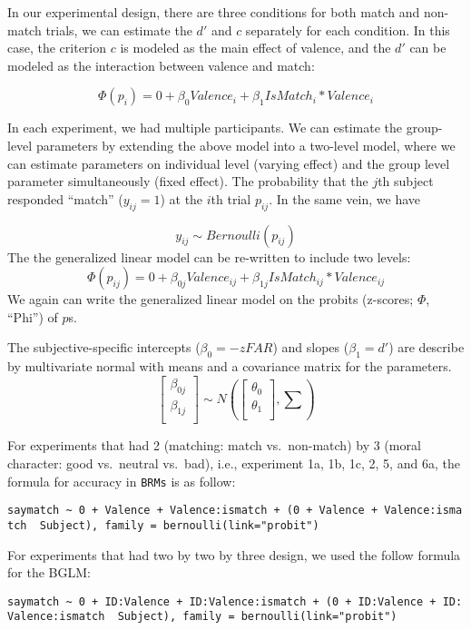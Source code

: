 \documentclass[
  english,
  man]{apa6}
\begin{document}
In our experimental design, there are three conditions for both match and non-match trials, we can estimate the \(d'\) and \(c\) separately for each condition. In this case, the criterion \(c\) is modeled as the main effect of valence, and the \(d'\) can be modeled as the interaction between valence and match:

\[ \Phi(p_{i}) = 0 + \beta_{0}Valence_{i} + \beta_{1}IsMatch_{i}  * Valence_{i} \]

In each experiment, we had multiple participants. We can estimate the group-level parameters by extending the above model into a two-level model, where we can estimate parameters on individual level (varying effect) and the group level parameter simultaneously (fixed effect). The probability that the \(j\)th subject responded ``match'' (\(y_{ij} = 1\)) at the \(i\)th trial \(p_{ij}\). In the same vein, we have

\[ y_{ij} \sim Bernoulli(p_{ij})\]
The the generalized linear model can be re-written to include two levels:
\[ \Phi(p_{ij}) = 0 + \beta_{0j}Valence_{ij} + \beta_{1j}IsMatch_{ij} * Valence_{ij}\]
We again can write the generalized linear model on the probits (z-scores; \(\Phi\), ``Phi'') of \(p\)s.

The subjective-specific intercepts (\(\beta_{0} = -zFAR\)) and slopes (\(\beta_{1} = d'\)) are describe by multivariate normal with means and a covariance matrix for the parameters.
\[ \begin{bmatrix}\beta_{0j}\\
\beta_{1j}\\
\end{bmatrix} \sim N(\begin{bmatrix}\theta_{0}\\
\theta_{1}\\
\end{bmatrix}, \sum) \]

For experiments that had 2 (matching: match vs.~non-match) by 3 (moral character: good vs.~neutral vs.~bad), i.e., experiment 1a, 1b, 1c, 2, 5, and 6a, the formula for accuracy in \texttt{BRMs} is as follow:

\texttt{saymatch\ \textasciitilde{}\ 0\ +\ Valence\ +\ Valence:ismatch\ +\ (0\ +\ Valence\ +\ Valence:ismatch\ \textbar{}\ Subject),\ family\ =\ bernoulli(link="probit")}

For experiments that had two by two by three design, we used the follow formula for the BGLM:

\texttt{saymatch\ \textasciitilde{}\ 0\ +\ ID:Valence\ +\ ID:Valence:ismatch\ +\ (0\ +\ ID:Valence\ +\ ID:Valence:ismatch\ \textbar{}\ Subject),\ family\ =\ bernoulli(link="probit")}
\end{document}
